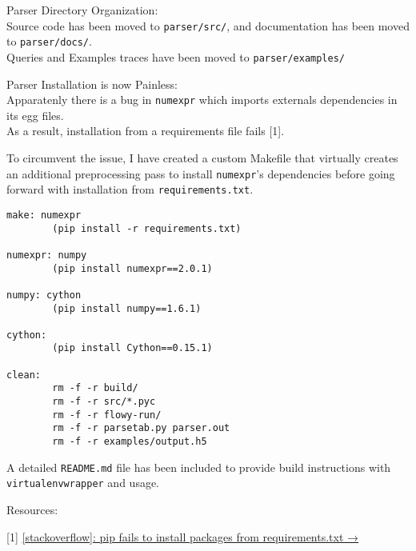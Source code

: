 Parser Directory Organization:\\Source code has been moved to
\lstinline!parser/src/!, and documentation has been moved to
\lstinline!parser/docs/!.\\Queries and Examples traces have been moved
to \lstinline!parser/examples/!

Parser Installation is now Painless:\\Apparatenly there is a bug in
\lstinline!numexpr! which imports externals dependencies in its egg
files.\\As a result, installation from a requirements file fails
{[}1{]}.

To circumvent the issue, I have created a custom Makefile that virtually
creates an additional preprocessing pass to install
\lstinline!numexpr!'s dependencies before going forward with
installation from \lstinline!requirements.txt!.

\begin{lstlisting}
make: numexpr
        (pip install -r requirements.txt)

numexpr: numpy
        (pip install numexpr==2.0.1)

numpy: cython
        (pip install numpy==1.6.1)

cython:
        (pip install Cython==0.15.1)

clean:
        rm -f -r build/
        rm -f -r src/*.pyc
        rm -f -r flowy-run/
        rm -f -r parsetab.py parser.out
        rm -f -r examples/output.h5
\end{lstlisting}

A detailed \lstinline!README.md! file has been included to provide build
instructions with \lstinline!virtualenvwrapper! and usage.

Resources:

{[}1{]}
\href{http://stackoverflow.com/questions/11015692/pip-fails-to-install-packages-from-requirements-txt}{{[}stackoverflow{]}:
pip fails to install packages from requirements.txt →}
